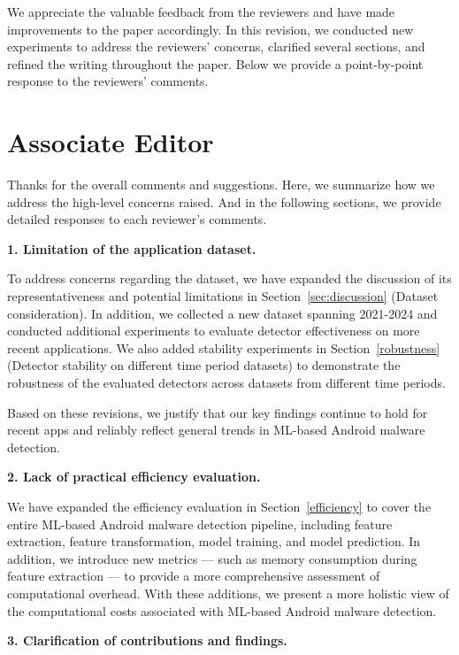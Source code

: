 
We appreciate the valuable feedback from the reviewers and have made improvements to the paper accordingly.
In this revision, we conducted new experiments to address the reviewers' concerns, clarified several sections, and refined the writing throughout the paper.
Below we provide a point-by-point response to the reviewers' comments.

\section*{Associate Editor}
Thanks for the overall comments and suggestions.
Here, we summarize how we address the high-level concerns raised. And in the following sections, we provide detailed responses to each reviewer's comments.

\vspace{0.1cm}
\noindent \textbf{1. Limitation of the application dataset.}

To address concerns regarding the dataset, we have expanded the discussion of its representativeness and potential limitations in Section~\ref{sec:discussion} (Dataset consideration). In addition, we collected a new dataset spanning 2021-2024 and conducted additional experiments to evaluate detector effectiveness on more recent applications. We also added stability experiments in Section~\ref{robustness} (Detector stability on different time period datasets) to demonstrate the robustness of the evaluated detectors across datasets from different time periods.

Based on these revisions, we justify that our key findings continue to hold for recent apps and reliably reflect general trends in ML-based Android malware detection.

\vspace{0.1cm}
\noindent \textbf{2. Lack of practical efficiency evaluation.}

We have expanded the efficiency evaluation in Section~\ref{efficiency} to cover the entire ML-based Android malware detection pipeline, including feature extraction, feature transformation, model training, and model prediction. In addition, we introduce new metrics --- such as memory consumption during feature extraction --- to provide a more comprehensive assessment of computational overhead. With these additions, we present a more holistic view of the computational costs associated with ML-based Android malware detection.

\vspace{0.1cm}
\noindent \textbf{3. Clarification of contributions and findings.}

